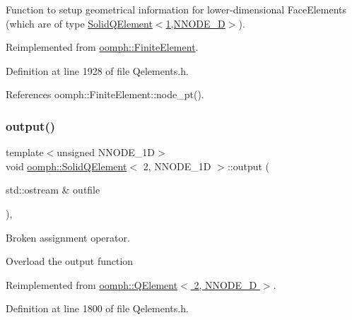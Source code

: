 Function to setup geometrical information for lower-\/dimensional Face\+Elements (which are of type \hyperlink{classoomph_1_1SolidQElement_3_011_00_01NNODE__1D_01_4}{Solid\+Q\+Element$<$1,\+N\+N\+O\+D\+E\+\_\+D$>$}). 

Reimplemented from \hyperlink{classoomph_1_1FiniteElement_aaf7bead5b462cfd5401d97b3dbdc7af7}{oomph\+::\+Finite\+Element}.



Definition at line 1928 of file Qelements.\+h.



References oomph\+::\+Finite\+Element\+::node\+\_\+pt().

\mbox{\label{classoomph_1_1SolidQElement_3_012_00_01NNODE__1D_01_4_a849d3059d7f4e6080bc889f1acb381dd}} 
\subsubsection{\texorpdfstring{output()}{output()}\hspace{0.1cm}{\footnotesize\ttfamily [1/4]}}
{\footnotesize\ttfamily template$<$unsigned N\+N\+O\+D\+E\+\_\+1D$>$ \\
void \hyperlink{classoomph_1_1SolidQElement}{oomph\+::\+Solid\+Q\+Element}$<$ 2, N\+N\+O\+D\+E\+\_\+1D $>$\+::output (\begin{DoxyParamCaption}\item[{std\+::ostream \&}]{outfile }\end{DoxyParamCaption})\hspace{0.3cm}{\ttfamily [inline]}, {\ttfamily [virtual]}}



Broken assignment operator. 

Overload the output function 

Reimplemented from \hyperlink{classoomph_1_1QElement_3_012_00_01NNODE__1D_01_4_ab7bb815a43598e7ce0c4d10c511504fc}{oomph\+::\+Q\+Element$<$ 2, N\+N\+O\+D\+E\+\_\+D $>$}.



Definition at line 1800 of file Qelements.\+h.



